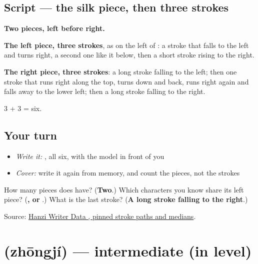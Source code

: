 \subsection*{Script — the silk piece, then three strokes}

\begin{quote}
\end{quote}

\textbf{Two pieces, left before right.}

\textbf{The left piece, three strokes}, as on the left of : a stroke that falls to the left and turns right, a second one like it below, then a short stroke rising to the right.

\textbf{The right piece, three strokes}: a long stroke falling to the left; then one stroke that runs right along the top, turns down and back, runs right again and falls away to the lower left; then a long stroke falling to the right.

3 + 3 = six.

\subsection*{Your turn}
\begin{itemize}
\raggedright
  \item \emph{Write it:} , all six, with the model in front of you
  \item \emph{Cover:} write it again from memory, and count the pieces, not the strokes
\end{itemize}

\begin{tcolorbox}[breakable,colback=teal!4,colframe=teal!35!black,title={Before you move on}]
How many pieces does  have? (\textbf{Two}.) Which characters you know share its left piece? (\textbf{,  or }.) What is the last stroke? (\textbf{A long stroke falling to the right}.)

Source: \href{https://raw.githubusercontent.com/chanind/hanzi-writer-data/68d10a4b21150cae5e1ebbd223eed289cf32d90c/data/\%E7\%BA\%A7.json}{Hanzi Writer Data , pinned stroke paths and medians}.
\end{tcolorbox}
\section[\texorpdfstring{\zh{中级} (zhōngjí)}{中级 (zhōngjí)}]{ (zhōngjí) — intermediate (in level)}

